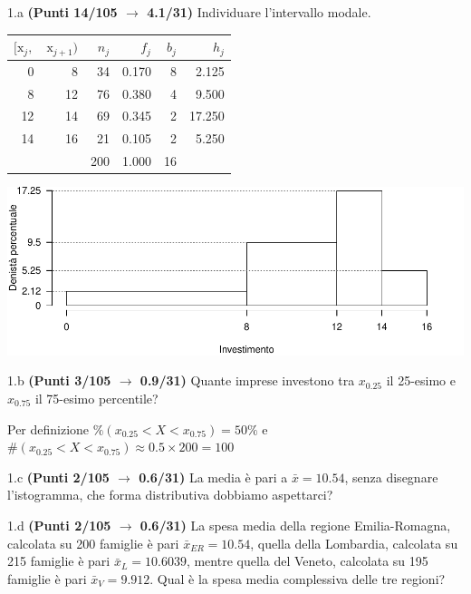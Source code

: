 \documentclass[
  11pt,
]{book}
\theoremstyle{mytheoremstyle}
\theoremstyle{mydefstyle}
\newenvironment{sol}
  {
  \begin{tcolorbox}[enhanced,breakable,arc=0.1mm,boxrule=1pt,colback=white,colframe=iblue,
  title=\bf \fontfamily{lmss}\selectfont \hspace{.5 cm} Soluzione,drop fuzzy shadow]

}{
\end{tcolorbox}
  }
\begin{document}
1.a \textbf{(Punti 14/105 \(\rightarrow\) 4.1/31)} Individuare l'intervallo modale.

\begin{sol}

\begin{table}[H]
\centering
\begin{tabular}{rrrrrr}
\toprule
$[\text{x}_j,$ & $\text{x}_{j+1})$ & $n_j$ & $f_j$ & $b_j$ & $h_j$\\
\midrule
0 & 8 & 34 & 0.170 & 8 & 2.125\\
8 & 12 & 76 & 0.380 & 4 & 9.500\\
12 & 14 & 69 & 0.345 & 2 & 17.250\\
14 & 16 & 21 & 0.105 & 2 & 5.250\\
 &  & 200 & 1.000 & 16 & \\
\bottomrule
\end{tabular}
\end{table}

\begin{center}\includegraphics{Esami_passati_con_soluzioni_files/figure-latex/2024-116-1} \end{center}

\end{sol}

1.b \textbf{(Punti 3/105 \(\rightarrow\) 0.9/31)} Quante imprese investono tra \(x_{0.25}\) il 25-esimo e \(x_{0.75}\) il 75-esimo percentile?

\begin{sol}
Per definizione \(\%(x_{0.25}<X<x_{0.75})=50\%\) e
\(\#(x_{0.25}<X<x_{0.75})\approx0.5\times200 =100\)

\end{sol}

1.c \textbf{(Punti 2/105 \(\rightarrow\) 0.6/31)} La media è pari a \(\bar x=10.54\), senza disegnare l'istogramma, che forma distributiva dobbiamo aspettarci?

1.d \textbf{(Punti 2/105 \(\rightarrow\) 0.6/31)} La spesa media della regione Emilia-Romagna, calcolata su 200 famiglie è pari \(\bar x_{ER}=10.54\), quella della Lombardia, calcolata su 215 famiglie è pari \(\bar x_{L}=10.6039\), mentre quella del Veneto, calcolata su 195 famiglie è pari \(\bar x_{V}=9.912\). Qual è la spesa media complessiva delle tre regioni?
\end{document}
